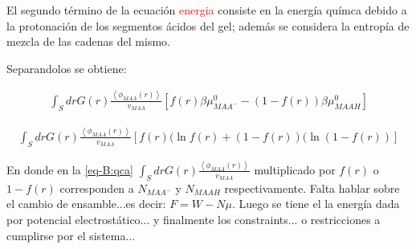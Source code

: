 El segundo t\'ermino de la ecuaci\'on \textcolor{red}{energia} consiste en la energ\'ia qu\'imca debido a la protonaci\'on de los segmentos \'acidos del gel; adem\'as se considera la entrop\'ia de mezcla de las cadenas del mismo.

Separandolos se obtiene:

\begin{align}    
	\int_S drG(r)\frac{\left<\phi_{MAA}(r)\right>}{v_{MAA}}\left[ f(r)\beta\mu^0_{MAA^-} -(1-f(r))\beta\mu^0_{MAAH} \right]
	\label{eq-B:qca}
\end{align}

\begin{align}
	\int_S drG(r)\frac{\left<\phi_{MAA}(r)\right>}{v_{MAA}} \left[f(r)(\ln f(r)+(1-f(r))(\ln(1-f(r))\right] 
	\label{eq-B:traslacion}
\end{align}    

En donde en la \ref{eq-B:qca} $\int_S drG(r)\frac{\left<\phi_{MAA}(r)\right>}{v_{MAA}}$ multiplicado por $f(r)$ o $1-f(r)$ corresponden a $N_{MAA^-}$ y $N_{MAAH}$ respectivamente.
Falta hablar sobre el cambio de ensamble...es decir: $F= W -N\mu$.
Luego se tiene el la energ\'ia dada por potencial electrost\'atico... y finalmente los constraints... o restricciones a cumplirse por el sistema...   